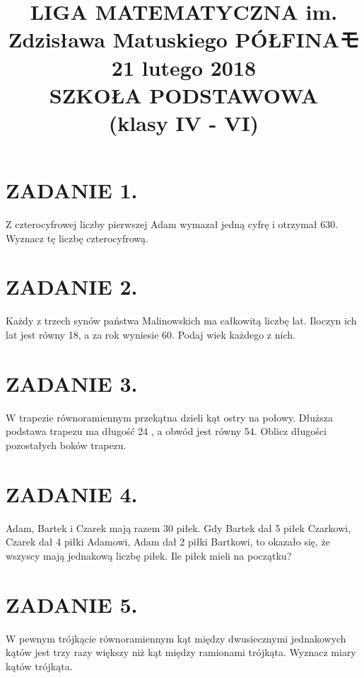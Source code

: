 \documentclass[10pt]{article}
\title{LIGA MATEMATYCZNA im. Zdzisława Matuskiego PÓŁFINAモ \\
 21 lutego 2018 \\
 SZKOŁA PODSTAWOWA \\
 (klasy IV - VI) }
\author{}
\date{}
\begin{document}
\maketitle
\section*{ZADANIE 1.}
Z czterocyfrowej liczby pierwszej Adam wymazał jedną cyfrę i otrzymał 630. Wyznacz tę liczbę czterocyfrową.

\section*{ZADANIE 2.}
Każdy z trzech synów państwa Malinowskich ma całkowitą liczbę lat. Iloczyn ich lat jest równy 18, a za rok wyniesie 60. Podaj wiek każdego z nich.

\section*{ZADANIE 3.}
W trapezie równoramiennym przekątna dzieli kąt ostry na połowy. Dłuższa podstawa trapezu ma długość 24 , a obwód jest równy 54. Oblicz długości pozostałych boków trapezu.

\section*{ZADANIE 4.}
Adam, Bartek i Czarek mają razem 30 piłek. Gdy Bartek dał 5 piłek Czarkowi, Czarek dał 4 piłki Adamowi, Adam dał 2 piłki Bartkowi, to okazało się, że wszyscy mają jednakową liczbę piłek. Ile piłek mieli na początku?

\section*{ZADANIE 5.}
W pewnym trójkącie równoramiennym kąt między dwusiecznymi jednakowych kątów jest trzy razy większy niż kąt między ramionami trójkąta. Wyznacz miary kątów trójkąta.
\end{document}
